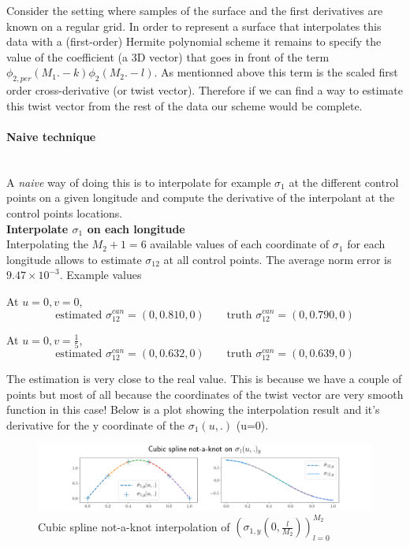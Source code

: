 \documentclass[a4paper, 11pt]{article}
\begin{document}
Consider the setting where samples of the surface and the first derivatives are known on a regular grid. In order to 
represent a surface that interpolates this data with a (first-order) Hermite polynomial scheme it remains to specify the 
value of the coefficient (a 3D vector) that goes in front of the term $\phi_{2, per}(M_1.-k)\phi_{2}(M_2.-l)$. As 
mentionned above this term is the scaled first order cross-derivative (or twist vector). Therefore if we can find a way 
to estimate this twist vector from the rest of the data our scheme would be complete. \\

\paragraph{Naive technique} \mbox{}\\

A \emph{naive} way of doing this is to interpolate for example $\sigma_1$ at the different control points on a given 
longitude and compute the derivative of the interpolant at the control points locations. \\

\textbf{Interpolate $\sigma_1$ on each longitude} \mbox{} \\

Interpolating the $M_2+1=6$ available values of each coordinate of $\sigma_1$ for each longitude allows to estimate 
$\sigma_{12}$ at all control points. The average norm error is $9.47\times 10^{-3}$. Example values 

At $u=0, v=0$,
\begin{equation*}
  \text{estimated } \sigma_{12}^{can} = (0, 0.810, 0) \qquad \text{truth } \sigma_{12}^{can} = (0, 0.790, 0) 
\end{equation*}

At $u=0, v=\frac{1}{5}$,
\begin{equation*}
  \text{estimated } \sigma_{12}^{can} = (0, 0.632, 0) \qquad \text{truth } \sigma_{12}^{can} = (0, 0.639, 0) 
\end{equation*}

The estimation is very close to the real value. This is because we have a couple of points but most of all because the 
coordinates of the twist vector are very smooth function in this case! Below is a plot showing the interpolation result 
and it's derivative for the y coordinate of the $\sigma_1(u,.)$ (u=0). 
 
\begin{figure}[h!]
  \includegraphics[width=\textwidth]{cubic_sigma_1.png}
  \caption{Cubic spline not-a-knot interpolation of ${\left(\sigma_{1,y}(0,\frac{l}{M_2})\right)}_{l=0}^{M_2}$}
\end{figure}
\end{document}
